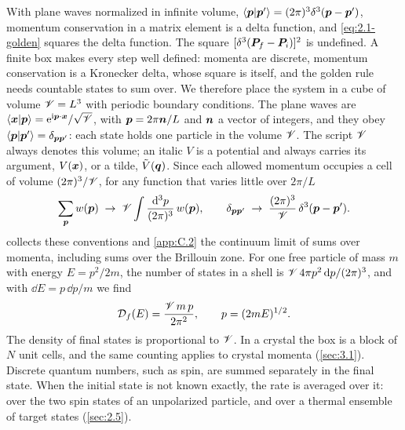 With plane waves normalized in infinite volume, $\langle\bm{p}|\bm{p}'\rangle = (2\pi)^3\delta^3(\bm{p} - \bm{p}')$, momentum conservation in a matrix element is a delta function, and \cref{eq:2.1-golden} squares the delta function. The square $[\delta^3(\bm{P}_f - \bm{P}_i)]^2$ is undefined. A finite box makes every step well defined: momenta are discrete, momentum conservation is a Kronecker delta, whose square is itself, and the golden rule needs countable states to sum over. We therefore place the system in a cube of volume $\mathscr{V} = L^3$ with periodic boundary conditions. The plane waves are $\langle\bm{x}|\bm{p}\rangle = \mathrm{e}^{\mathrm{i}\bm{p}\cdot\bm{x}}/\sqrt{\mathscr{V}}$, with $\bm{p} = 2\pi\bm{n}/L$ and $\bm{n}$ a vector of integers, and they obey $\langle\bm{p}|\bm{p}'\rangle = \delta_{\bm{p}\bm{p}'}$: each state holds one particle in the volume $\mathscr{V}$. The script $\mathscr{V}$ always denotes this volume; an italic $V$ is a potential and always carries its argument, $V(\bm{x})$, or a tilde, $\tilde V(\bm{q})$. Since each allowed momentum occupies a cell of volume $(2\pi)^3/\mathscr{V}$, for any function that varies little over $2\pi/L$~\cite[Eqs.~(A1) and (A2)]{lin2019tasi}
\begin{equation}
  \sum_{\bm{p}}w(\bm{p}) \;\to\; \mathscr{V}\int\frac{\mathrm{d}^3p}{(2\pi)^3}\,w(\bm{p}), \qquad
  \delta_{\bm{p}\bm{p}'} \;\to\; \frac{(2\pi)^3}{\mathscr{V}}\,\delta^3(\bm{p} - \bm{p}') .
  \label{eq:2.1-box}
\end{equation}
 collects these conventions and \cref{app:C.2} the continuum limit of sums over momenta, including sums over the Brillouin zone. For one free particle of mass $m$ with energy $E = p^2/2m$, the number of states in a shell is $\mathscr{V}\,4\pi p^2\,\mathrm{d} p/(2\pi)^3$, and with $\dd E = p\,\dd p/m$ we find
\begin{equation}
  \mathcal{D}_f(E) = \frac{\mathscr{V}\,m\,p}{2\pi^2}, \qquad p = (2mE)^{1/2} .
  \label{eq:2.1-Dfree}
\end{equation}
The density of final states is proportional to $\mathscr{V}$. In a crystal the box is a block of $N$ unit cells, and the same counting applies to crystal momenta (\cref{sec:3.1}). Discrete quantum numbers, such as spin, are summed separately in the final state. When the initial state is not known exactly, the rate is averaged over it: over the two spin states of an unpolarized particle, and over a thermal ensemble of target states (\cref{sec:2.5}).

